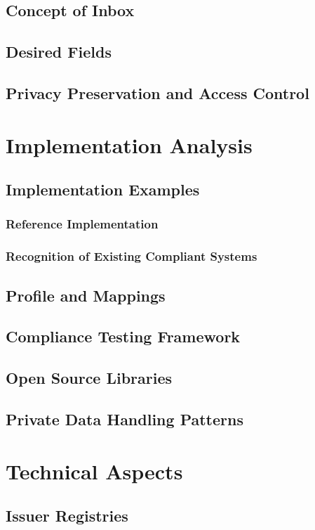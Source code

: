 \documentclass[11pt]{article}
\begin{document}
\subsection{Concept of Inbox}
\subsection{Desired Fields}
\subsection{Privacy Preservation and Access Control}

\section{Implementation Analysis}
\subsection{Implementation Examples}
\subsubsection{Reference Implementation}
\subsubsection{Recognition of Existing Compliant Systems}
\subsection{Profile and Mappings}
\subsection{Compliance Testing Framework}
\subsection{Open Source Libraries}
\subsection{Private Data Handling Patterns}

\section{Technical Aspects}
\subsection{Issuer Registries}
\end{document}
